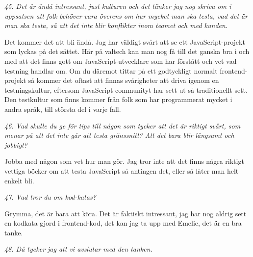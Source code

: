 \documentclass[11pt]{article}
\begin{document}
\emph{45. Det är ändå intressant, just kulturen och det tänker jag nog skriva om i uppsatsen att folk behöver vara överens om hur mycket man ska testa, vad det är man ska testa, så att det inte blir konflikter inom teamet och med kunden.}

Det kommer det att bli ändå. Jag har väldigt svårt att se ett JavaScript-projekt som lyckas på det sättet. Här på valtech kan man nog få till det ganska bra i och med att det finns gott om JavaScript-utvecklare som har förstått och vet vad testning handlar om. Om du däremot tittar på ett godtyckligt normalt frontend-projekt så kommer det oftast att finnas svårigheter att driva igenom en testningskultur, eftersom JavaScript-communityt har sett ut så traditionellt sett. Den testkultur som finns kommer från folk som har programmerat mycket i andra språk, till största del i varje fall.

\emph{46. Vad skulle du ge för tips till någon som tycker att det är riktigt svårt, som menar på att det inte går att testa gränssnitt? Att det bara blir långsamt och jobbigt?}

Jobba med någon som vet hur man gör. Jag tror inte att det finns några riktigt vettiga böcker om att testa JavaScript så antingen det, eller så låter man helt enkelt bli.

\emph{47. Vad tror du om kod-katas?}

Grymma, det är bara att köra. Det är faktiskt intressant, jag har nog aldrig sett en kodkata gjord i frontend-kod, det kan jag ta upp med Emelie, det är en bra tanke.

\emph{48. Då tycker jag att vi avslutar med den tanken.}
\end{document}
